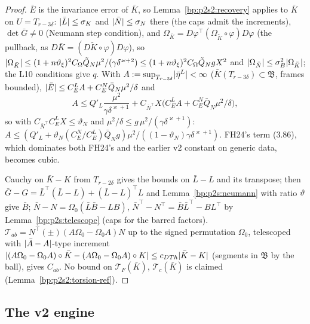 \begin{proof}
\label{step:p2s2:selfcons}
$\bar E$ is the invariance error of $\bar K$, so Lemma~\ref{bp:p2s2:recovery} applies to $\bar K$ on $U=T_{r-3\delta}$: $\lvert \bar L\rvert\le\sigma_K$ and $\lvert \bar N\rvert\le\sigma_N$ there
(the caps admit the increments), $\det\bar G\ne0$ (Neumann step condition), and $\Omega_{\bar K}=D\varphi^\top(\Omega_{\tilde K}\circ\varphi)D\varphi$ (the pullback, as
$D\bar K=(D\tilde K\circ\varphi)D\varphi$), so $\lvert \Omega_{\bar K}\rvert\le(1+n\vartheta_\xi)^2C_\Omega\tilde Q_N\mu^2/(\gamma\delta^{\varkappa+2})\le(1+n\vartheta_\xi)^2C_\Omega\tilde Q_NgX^2$
and $\lvert \Omega_{\bar N}\rvert\le\sigma_B^2\lvert \Omega_{\bar K}\rvert$; the L10 conditions give $q$. With $A:=\sup_{T_{r-3\delta}}\lvert \bar\eta^L\rvert<\infty$ ($\bar K(T_{r-3\delta})\subset\mathfrak B$, frames
bounded), $\lvert \bar E\rvert\le C^L_EA+C^N_E\bar Q_N\mu^2/\delta$ and
\[
A\le Q'_L\frac{\mu^2}{\gamma\delta^{\varkappa+1}}+C_{\bar N^\top}X\bigl(C^L_EA+C^N_E\bar Q_N\mu^2/\delta\bigr),
\]
so with $C_{\bar N^\top}C^L_EX\le\vartheta_N$ and $\mu^2/\delta\le g\,\mu^2/(\gamma\delta^{\varkappa+1})$: $A\le(Q'_L+\vartheta_N(C^N_E/C^L_E)\bar Q_Ng)\mu^2/((1-\vartheta_N)\gamma\delta^{\varkappa+1})$.
FH24's term (3.86), which dominates both FH24's and the earlier v2 constant on generic data, becomes cubic.

\label{step:p2s2:st-fr}
Cauchy on $\bar K-K$ from $T_{r-2\delta}$ gives the bounds on $\bar L-L$ and its transpose; then $\bar G-G=\bar L^\top(\bar L-L)+(\bar L-L)^\top L$ and
Lemma~\ref{bp:p2s:neumann} with ratio $\vartheta$ give $\bar B$; $\bar N-N=\Omega_0(\bar L\bar B-LB)$, $\bar N^\top-N^\top=\bar B\bar L^\top-BL^\top$ by
Lemma~\ref{bp:p2s:telescope} (caps for the barred factors). $\mathcal T_{ab}=N^{\top}(\pm)(A\Omega_0-\Omega_0A)N$ up to the signed permutation $\Omega_0$, telescoped with
$\lvert \bar A-A\rvert$-type increment $\lvert (A\Omega_0-\Omega_0A)\circ\bar K-(A\Omega_0-\Omega_0A)\circ K\rvert\le c_{DTh}\lvert \bar K-K\rvert$ (segments in $\mathfrak B$ by the ball), gives $C_{ab}$.
No bound on $\mathcal T_F(\bar K)$, $\mathcal T_c(\bar K)$ is claimed (Lemma~\ref{bp:p2s2:torsion-ref}).
\end{proof}

\subsection{The v2 engine}\label{bp:p2s2:sec-engine}

